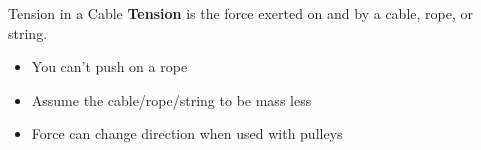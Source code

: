 \documentclass[12pt,compress,aspectratio=169]{beamer}
\newcommand{\pic}[2]{\texttt{[image: \#2]}}
\begin{document}
%
%


\begin{frame}{Tension in a Cable}
  \textbf{Tension} is the force exerted on and by a cable, rope,
  or string.

  \begin{itemize}
  \item You can't push on a rope
  \item Assume the cable/rope/string to be mass less
  \item Force can change direction when used with pulleys
  \end{itemize}
\end{frame}
\end{document}
